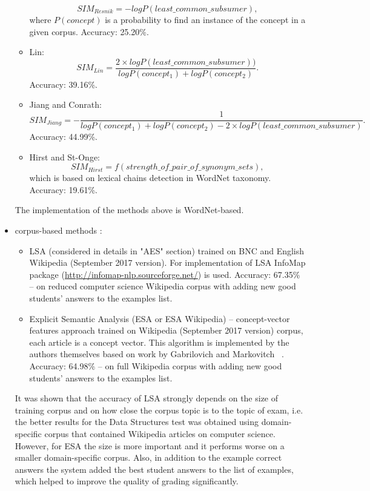 \documentclass[11pt]{report}
\numberwithin{equation}{section} %
\begin{document}
\begin{itemize}
\begin{itemize}
\begin{equation}
SIM_{Resnik} = -log P(least\_common\_subsumer),
\end{equation}
where $P(concept)$ is a probability to find an instance of the concept in a given corpus. Accuracy: 25.20\%.
\item Lin:
\begin{equation} \label{eq:Lin}
SIM_{Lin} = \frac{2 \times log P(least\_common\_subsumer))}{log P(concept_1) + log P(concept_2)}.
\end{equation}
Accuracy: 39.16\%.
\item Jiang and Conrath:
\begin{equation} \label{eq:Jiang}
SIM_{Jiang} = - \frac{1}{log P(concept_1) + log P(concept_2) - 2 \times log P(least\_common\_subsumer) }.
\end{equation}
Accuracy: 44.99\%.
\item Hirst and St-Onge:
\begin{equation} \label{eq:Hirst}
SIM_{Hirst} = f(strength\_of\_pair\_of\_synonym\_sets),
\end{equation}
which is based on lexical chains detection in WordNet taxonomy. Accuracy: 19.61\%.
\end{itemize}
The implementation of the methods above is WordNet-based.
\item corpus-based methods :
\begin{itemize}
\item LSA (considered in details in "AES" section) trained on BNC and English Wikipedia (September 2017 version). For implementation of LSA InfoMap package (\url{http://infomap-nlp.sourceforge.net/}) is used. Accuracy: 67.35\% -- on reduced computer science Wikipedia corpus with adding new good students' answers to the examples list.
\item Explicit Semantic Analysis (ESA or ESA Wikipedia) -- concept-vector features approach trained on Wikipedia (September 2017 version) corpus, each article is a concept vector. This algorithm is implemented by the authors themselves based on work by Gabrilovich and Markovitch ~\cite{Gabrilovich}. Accuracy: 64.98\% -- on full Wikipedia corpus with adding new good students' answers to the examples list.
\end{itemize}
It was shown that the accuracy of LSA strongly depends on the size of training corpus and on how close the corpus topic is to the topic of exam, i.e. the better results for the Data Structures test was obtained using domain-specific corpus that contained Wikipedia articles on computer science. However, for ESA the size is more important and it performs worse on a smaller domain-specific corpus. Also, in addition to the example correct answers the system added the best student answers to the list of examples, which helped to improve the quality of grading significantly. 
\end{itemize}
\end{document}

